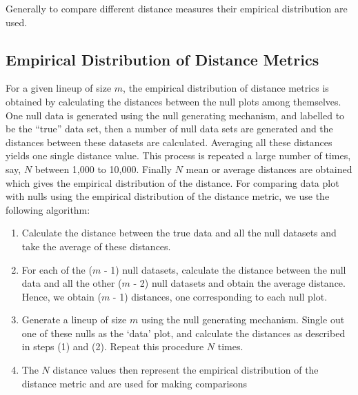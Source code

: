 \documentclass[12pt]{article}\usepackage[]{graphicx}\usepackage[]{color}
\newcommand{\hh}[1]{{\color{magenta} #1}}
\begin{document}
% 

Generally to compare different distance measures their empirical distribution are used.

\subsection{Empirical Distribution of Distance Metrics} \label{sec:distri}

For a given lineup of size $m$, the empirical distribution of distance metrics is obtained by calculating the distances between the null plots among themselves. One null data is generated using the null generating mechanism, and labelled to be the ``true'' data set, then a number of null data sets are generated and the distances between these datasets are calculated. Averaging all these distances yields one single distance value. This process is repeated a large number of times, say, $N$ between 1,000 to 10,000. Finally $N$ mean or average distances are obtained which gives the empirical distribution of the distance. For comparing data plot with nulls using the empirical distribution of the distance metric, we use the following algorithm:

\begin{enumerate} \itemsep 0in
\item Calculate the distance between the true data and all the null datasets and take the average of these distances. 

\item For each of the ($m$ - 1) null datasets, calculate the distance between the null data and all the other ($m$ - 2) null datasets and obtain the average distance. Hence, we obtain ($m$ - 1) distances, one corresponding to each  null plot.

\item Generate a lineup of size $m$ using the null generating mechanism. 
Single out one of these nulls as the `data' plot, and calculate the distances as described in steps (1) and (2). Repeat this procedure $N$ times.

\item The $N$ distance values then represent the empirical distribution of the distance metric and are used for making comparisons
\end{enumerate}
\end{document}
